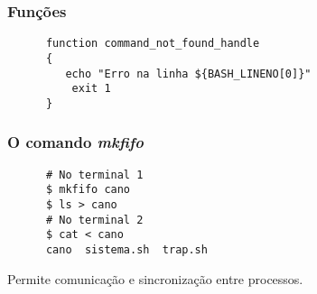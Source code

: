 \documentclass{beamer}
\begin{document}

   \begin{frame}[fragile]
      \frametitle{Funções}
      \begin{verbatim}
      function command_not_found_handle
      {
         echo "Erro na linha ${BASH_LINENO[0]}"
	      exit 1
      }
      \end{verbatim}
\end{frame}


   \begin{frame}[fragile]
      \frametitle{O comando \textit{mkfifo}}
      \begin{verbatim}
      # No terminal 1
      $ mkfifo cano
      $ ls > cano
      # No terminal 2
      $ cat < cano
      cano  sistema.sh  trap.sh
      \end{verbatim}
      Permite comunicação e sincronização entre processos.
\end{frame}
\end{document}

